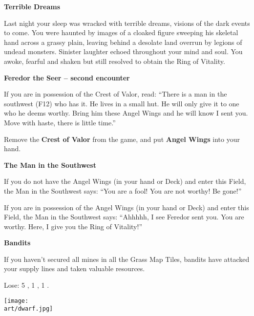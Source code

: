 \begin{multicols*}{2}
\textbf{Terrible Dreams}

Last night your sleep was wracked with terrible dreams, visions of the dark events to come.
You were haunted by images of a cloaked figure sweeping his skeletal hand across a grassy plain, leaving behind a desolate land overrun by legions of undead monsters.
Sinister laughter echoed throughout your mind and soul.
You awoke, fearful and shaken but still resolved to obtain the Ring of Vitality.

\textbf{Feredor the Seer -- second encounter}

If you are in possession of the Crest of Valor, read: ``There is a man in the southwest (F12) who has it.
He lives in a small hut.
He will only give it to one who he deems worthy.
Bring him these Angel Wings and he will know I sent you.
Move with haste, there is little time.''

\textcolor{darkcandyapplered}{Remove the \textbf{Crest of Valor} from the game, and put \textbf{Angel Wings} into your hand.}

\textbf{The Man in the Southwest}

If you do not have the Angel Wings (in your hand or Deck) and enter this Field, the Man in the Southwest says: ``You are a fool! You are not worthy! Be gone!''

If you are in possession of the Angel Wings (in your hand or Deck) and enter this Field, the Man in the Southwest says: ``Ahhhhh, I see Feredor sent you.
You are worthy.
Here, I give you the Ring of Vitality!''

\textbf{Bandits}

If you haven't secured all mines in all the Grass Map Tiles, bandits have attacked your supply lines and taken valuable resources.

\textcolor{darkcandyapplered}{Lose: 5 , 1 , 1 .}

\vspace*{\fill}
\texttt{[image: \\art/dwarf.jpg]}

\end{multicols*}
